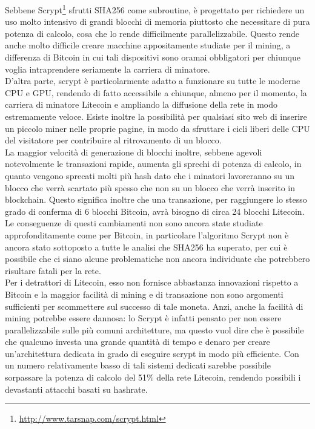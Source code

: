 Sebbene Scrypt\footnote{\url{http://www.tarsnap.com/scrypt.html}} sfrutti SHA256 come subroutine, è progettato per richiedere un uso molto intensivo di grandi blocchi di memoria piuttosto che necessitare di pura potenza di calcolo, cosa che lo rende difficilmente parallelizzabile. Questo rende anche molto difficile creare macchine appositamente studiate per il mining, a differenza di Bitcoin in cui tali dispositivi sono oramai obbligatori per chiunque voglia intraprendere seriamente la carriera di minatore.\\
D'altra parte, scrypt è particolarmente adatto a funzionare su tutte le moderne CPU e GPU, rendendo di fatto accessibile a chiunque, almeno per il momento, la carriera di minatore Litecoin e ampliando la diffusione della rete in modo estremamente veloce. Esiste inoltre la possibilità per qualsiasi sito web di inserire un piccolo miner nelle proprie pagine, in modo da sfruttare i cicli liberi delle CPU del visitatore per contribuire al ritrovamento di un blocco.\\
La maggior velocità di generazione di blocchi inoltre, sebbene agevoli notevolmente le transazioni rapide, aumenta gli sprechi di potenza di calcolo, in quanto vengono sprecati molti più hash dato che i minatori lavoreranno su un blocco che verrà scartato più spesso che non su un blocco che verrà inserito in blockchain. Questo significa inoltre che una transazione, per raggiungere lo stesso grado di conferma di 6 blocchi Bitcoin, avrà bisogno di circa 24 blocchi Litecoin.\\

Le conseguenze di questi cambiamenti non sono ancora state studiate approfonditamente come per Bitcoin, in particolare l'algoritmo Scrypt non è ancora stato sottoposto a tutte le analisi che SHA256 ha superato, per cui è possibile che ci siano alcune problematiche non ancora individuate che potrebbero risultare fatali per la rete.\\
Per i detrattori di Litecoin, esso non fornisce abbastanza innovazioni rispetto a Bitcoin e la maggior facilità di mining e di transazione non sono argomenti sufficienti per scommettere sul successo di tale moneta. Anzi, anche la facilità di mining potrebbe essere dannosa: lo Scrypt è infatti pensato per non essere parallelizzabile sulle più comuni architetture, ma questo vuol dire che è possibile che qualcuno investa una grande quantità di tempo e denaro per creare un'architettura dedicata in grado di eseguire scrypt in modo più efficiente. Con un numero relativamente basso di tali sistemi dedicati sarebbe possibile sorpassare la potenza di calcolo del 51\% della rete Litecoin, rendendo possibili i devastanti attacchi basati su hashrate.\\

